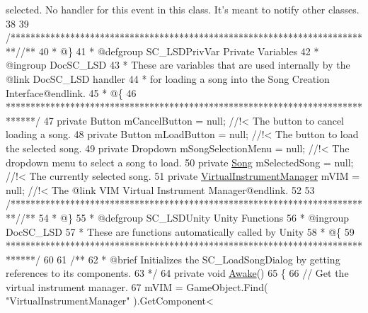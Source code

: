 \begin{DoxyCodeInclude}
{       selected. No handler for this event in this class. It's meant to notify other classes.}
38 \textcolor{comment}{}
39     \textcolor{comment}{/*************************************************************************/}\textcolor{comment}{/** }
40 \textcolor{comment}{    * @\}}
41 \textcolor{comment}{    * @defgroup SC\_LSDPrivVar Private Variables}
42 \textcolor{comment}{    * @ingroup DocSC\_LSD}
43 \textcolor{comment}{    * These are variables that are used internally by the @link DocSC\_LSD handler }
44 \textcolor{comment}{    * for loading a song into the Song Creation Interface@endlink.}
45 \textcolor{comment}{    * @\{}
46 \textcolor{comment}{    ******************************************************************************/}
47     \textcolor{keyword}{private} Button mCancelButton = null; \textcolor{comment}{//!< The button to cancel loading a song.}
48 \textcolor{comment}{}    \textcolor{keyword}{private} Button mLoadButton = null; \textcolor{comment}{//!< The button to load the selected song.}
49 \textcolor{comment}{}    \textcolor{keyword}{private} Dropdown mSongSelectionMenu = null; \textcolor{comment}{//!< The dropdown menu to select a song to load.}
50 \textcolor{comment}{}    \textcolor{keyword}{private} \hyperlink{class_song}{Song} mSelectedSong = null; \textcolor{comment}{//!< The currently selected song.}
51 \textcolor{comment}{}    \textcolor{keyword}{private} \hyperlink{class_virtual_instrument_manager}{VirtualInstrumentManager} mVIM = null; \textcolor{comment}{//!< The @link VIM Virtual
       Instrument Manager@endlink.}
52 \textcolor{comment}{}
53     \textcolor{comment}{/*************************************************************************/}\textcolor{comment}{/** }
54 \textcolor{comment}{    * @\}}
55 \textcolor{comment}{    * @defgroup SC\_LSDUnity Unity Functions}
56 \textcolor{comment}{    * @ingroup DocSC\_LSD}
57 \textcolor{comment}{    * These are functions automatically called by Unity}
58 \textcolor{comment}{    * @\{}
59 \textcolor{comment}{    ******************************************************************************/}
60 \textcolor{comment}{}
61 \textcolor{comment}{    /** }
62 \textcolor{comment}{     * @brief Initializes the SC\_LoadSongDialog by getting references to its components.}
63 \textcolor{comment}{    */}
64     \textcolor{keyword}{private} \textcolor{keywordtype}{void} \hyperlink{group___s_c___l_s_d_unity_ga2fe8760877d7edd380795cac5749be50}{Awake}()
65     \{
66         \textcolor{comment}{// Get the virtual instrument manager.}
67         mVIM = GameObject.Find( \textcolor{stringliteral}{"VirtualInstrumentManager"} ).GetComponent<

\end{DoxyCodeInclude}
